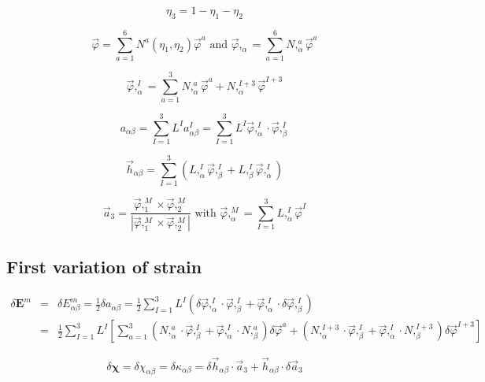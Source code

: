 \documentclass[12pt]{article}
\begin{document}
\begin{equation}
\eta_3 = 1 - \eta_1 - \eta_2
\end{equation}

\begin{equation}
\vec{\varphi} = \sum^6_{a=1} N^a(\eta_1,\eta_2)\vec{\varphi}^a
\mbox{ and }
\vec{\varphi},_{\alpha} = \sum^6_{a=1} N,^a_{\alpha}\vec{\varphi}^a
\end{equation}

\begin{equation}
\vec{\varphi},^I_{\alpha} = \sum_{a=1}^3 N,^a_{\alpha}\vec{\varphi}^a
 + N,^{I+3}_{\alpha}\vec{\varphi}^{I+3}
\end{equation}

\begin{equation}
a_{\alpha\beta} = \sum^3_{I=1} L^I a^I_{\alpha\beta}
 = \sum^3_{I=1} L^I \vec{\varphi},^I_{\alpha}\cdot \vec{\varphi},^I_{\beta}
\end{equation}

\begin{equation}
\vec{h}_{\alpha\beta} = \sum_{I=1}^3 (L,^I_{\alpha}\vec{\varphi},^I_{\beta}
 + L,^I_{\beta}\vec{\varphi},^I_{\alpha})
\end{equation}

\begin{equation}
\vec{a}_3 = \frac{\vec{\varphi},^M_1\times\vec{\varphi},^M_2}
{|\vec{\varphi},^M_1\times\vec{\varphi},^M_2|}
\mbox{ with }
\vec{\varphi},^M_{\alpha} = \sum^3_{I=1} L,^I_{\alpha}\vec{\varphi}^I
\end{equation}

%
\subsection{First variation of strain}
%
\begin{eqnarray}
\delta\pmb{E}^m &=& \delta E^m_{\alpha\beta} = \frac{1}{2}\delta a_{\alpha\beta}
 = \frac{1}{2}\sum^3_{I=1} L^I (\delta\vec{\varphi},^I_{\alpha}
   \cdot\vec{\varphi},^I_{\beta}
 + \vec{\varphi},^I_{\alpha}\cdot\delta\vec{\varphi},^I_{\beta}) \nonumber\\
 &=& \frac{1}{2}\sum^3_{I=1} L^I
  \left[\sum_{a=1}^3(N,^a_{\alpha}\cdot\vec{\varphi},^I_{\beta}
 + \vec{\varphi},^I_{\alpha}\cdot N,^a_{\beta})\delta\vec{\varphi}^a
 + (N,^{I+3}_{\alpha}\cdot\vec{\varphi},^I_{\beta}
 + \vec{\varphi},^I_{\alpha}\cdot N,^{I+3}_{\beta})\delta\vec{\varphi}^{I+3}\right]
\end{eqnarray}

\begin{equation}
\delta\pmb{\chi} = \delta \chi_{\alpha\beta} = \delta \kappa_{\alpha\beta}
 = \delta\vec{h}_{\alpha\beta}\cdot\vec{a}_3
 + \vec{h}_{\alpha\beta}\cdot\delta\vec{a}_3
\end{equation}
\end{document}
